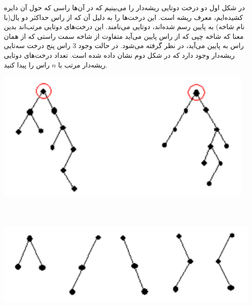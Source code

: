 \EXERCISE
در شکل اول دو درخت دوتایی ریشه‌دار را می‌بینیم که در آن‌ها راسی که حول آن دایره کشیده‌ایم، معرف ریشه است. این درخت‌ها را به دلیل آن که از راس حداکثر دو یال(با نام شاخه) به پایین رسم شده‌اند، دوتایی می‌نامند. این درخت‌های دوتایی مرتب‌اند بدین معنا که شاخه چپی که از راس پایین می‌آید متفاوت از شاخه سمت راستی که از همان راس به پایین می‌آید، در نظر گرفته می‌شود. در حالت وجود
$3$
راس پنج درخت سه‌تایی ریشه‌دار وجود دارد که در شکل دوم نشان داده شده است. تعداد درخت‌های دوتایی ریشه‌دار مرتب با
$n$
راس را پیدا کنید.
\begin{center}
\includegraphics[height=6.5cm]{19.png}
\end{center}
\begin{center}
\includegraphics[height=6.5cm]{20.png}
\end{center}